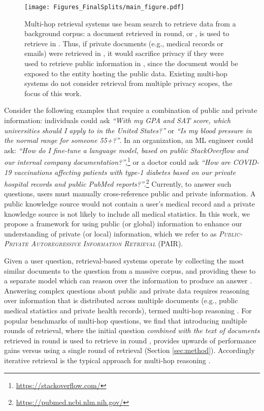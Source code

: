 \documentclass{article}
\renewcommand\cite{\citep}	\newcommand\shortcite{\citeyearpar}\newcommand\newcite{\citet}
\newcommand{\blue}[1]{{\color{blue}#1}}
\newcommand{\problemlongname}{\textsc{Public-Private Autoregressive Information Retrieval}\xspace}
\newcommand{\problemshortname}{\textsc{PAIR}\xspace}
\begin{document}
\begin{figure}
    \centering
    \texttt{[image: Figures\_FinalSplits/main\_figure.pdf]}
    \caption[width=\linewidth]{Multi-hop retrieval systems use beam search to retrieve data from a background corpus: a document retrieved in round, or \textit{}, is used to retrieve in . Thus, if private documents (e.g., medical records or emails) were retrieved in , it would sacrifice privacy if they were used to retrieve public information in , since the document would be exposed to the entity hosting the public data. Existing multi-hop systems do not consider retrieval from multiple privacy scopes, the focus of this work.}
    \label{fig:main}
    \vspace{-5mm}
\end{figure}

Consider the following examples that require a combination of public and \blue{private} information: individuals could ask \textit{``With \blue{my GPA and SAT score}, which universities should I apply to in the United States?''} or \textit{``Is \blue{my blood pressure} in the normal range for someone 55+?''}. In an organization, an ML engineer could ask: \textit{``How do I fine-tune a language model, based on public StackOverflow and \blue{our internal company documentation}?''},\footnote{\url{https://stackoverflow.com/}} or a doctor could ask \textit{``How are COVID-19 vaccinations affecting patients with type-1 diabetes based on \blue{our private hospital records} and public PubMed reports?''}.\footnote{\url{https://pubmed.ncbi.nlm.nih.gov/}}
Currently, to answer such questions, users must manually cross-reference public and private information. A public knowledge source would not contain a user's medical record and a private knowledge source is not likely to include all medical statistics.
In this work, we propose a framework for using public (or global) information to enhance our understanding of private (or local) information, which we refer to as \textit{\problemlongname} (\problemshortname).

Given a user question, retrieval-based systems operate by collecting the most similar documents to the question from a massive corpus, and providing these to a separate model which can reason over the information to produce an answer \cite{chen2017retrieveread}. Answering complex questions about public and private data requires reasoning over information that is distributed across multiple documents (e.g., public medical statistics and private health records), termed multi-hop reasoning \cite{welbl2018mhtask}. For popular benchmarks of multi-hop questions, we find that introducing multiple rounds of retrieval, where the initial question \textit{combined with the text of documents} retrieved in round  is used to retrieve in round , provides upwards of  performance gains versus using a single round of retrieval (Section \ref{sec:method}). Accordingly iterative retrieval is the typical approach for multi-hop reasoning \cite{miller2016kvm, feldman2019multihop, asai2020graphpathsqa, xiong2021mdr, qi2021irrrqa, khattab2021baleen}. 
\end{document}
